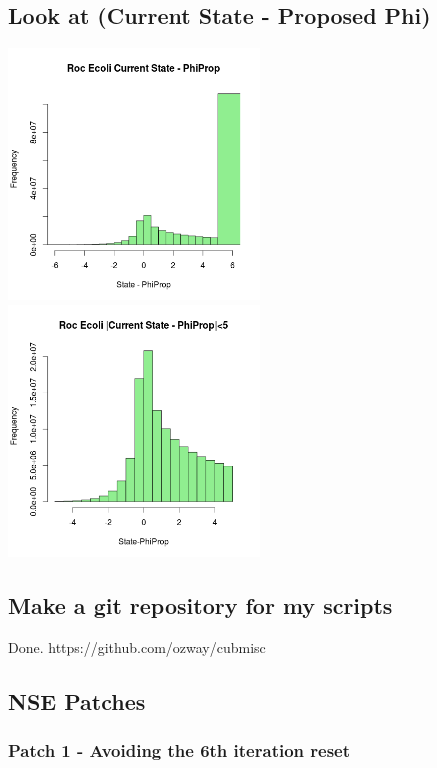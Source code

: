 \newpage
\subsection{Look at (Current State - Proposed Phi)}

\includegraphics[width=0.5\textwidth]{data/oct27reCurr-Prop.png}
\includegraphics[width=0.5\textwidth]{data/oct27reCurr-Prop_bounded.png}





\newpage
\subsection{Make a git repository for my scripts}

Done. https://github.com/ozway/cubmisc







\subsection{NSE Patches}

\subsubsection{Patch 1 - Avoiding the 6th iteration reset}


